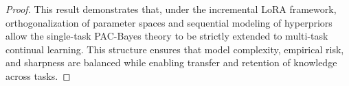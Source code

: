\documentclass[letterpaper]{article} %
\begin{document}
\begin{proof}
    



 This result demonstrates that, under the incremental LoRA framework, orthogonalization of parameter spaces and sequential modeling of hyperpriors allow the single-task PAC-Bayes theory to be strictly extended to multi-task continual learning. This structure ensures that model complexity, empirical risk, and sharpness are balanced while enabling transfer and retention of knowledge across tasks.




\end{proof}
\end{document}
